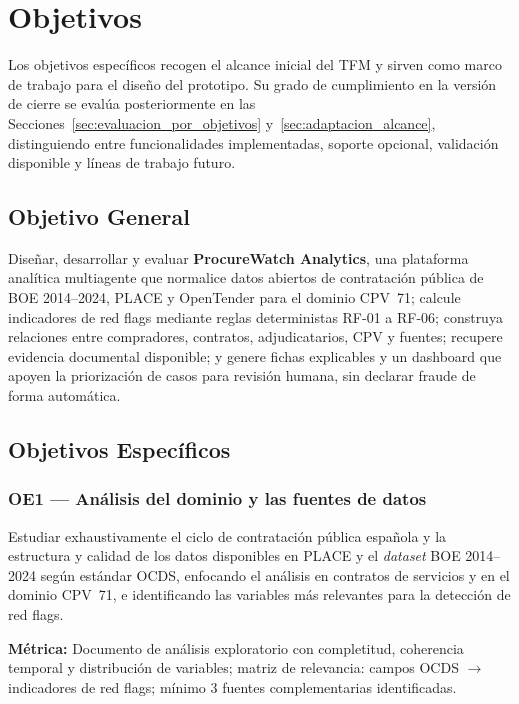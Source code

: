 \documentclass[11pt,a4paper,spanish]{book}
\numberwithin{equation}{chapter}
\numberwithin{figure}{chapter}
\begin{document}
\chapter{Objetivos}

Los objetivos espec{\'i}ficos recogen el alcance inicial del TFM y sirven como marco de trabajo para el dise{\~n}o del prototipo. Su grado de cumplimiento en la versi{\'o}n de cierre se eval{\'u}a posteriormente en las Secciones~\ref{sec:evaluacion_por_objetivos} y~\ref{sec:adaptacion_alcance}, distinguiendo entre funcionalidades implementadas, soporte opcional, validaci{\'o}n disponible y l{\'i}neas de trabajo futuro.

\section{Objetivo General}

Dise{\~n}ar, desarrollar y evaluar \textbf{ProcureWatch Analytics}, una plataforma anal{\'i}tica multiagente que normalice datos abiertos de contrataci{\'o}n p{\'u}blica de BOE 2014--2024, PLACE y OpenTender para el dominio CPV~71; calcule indicadores de red flags mediante reglas deterministas RF-01 a RF-06; construya relaciones entre compradores, contratos, adjudicatarios, CPV y fuentes; recupere evidencia documental disponible; y genere fichas explicables y un dashboard que apoyen la priorizaci{\'o}n de casos para revisi{\'o}n humana, sin declarar fraude de forma autom{\'a}tica.

\section{Objetivos Espec{\'i}ficos}

\subsection*{OE1 --- An{\'a}lisis del dominio y las fuentes de datos}
Estudiar exhaustivamente el ciclo de contrataci{\'o}n p{\'u}blica espa{\~n}ola y la estructura y calidad de los datos disponibles en PLACE y el \textit{dataset} BOE 2014--2024 seg{\'u}n est{\'a}ndar OCDS, enfocando el an{\'a}lisis en contratos de servicios y en el dominio CPV~71, e identificando las variables m{\'a}s relevantes para la detecci{\'o}n de red flags.

\textbf{M{\'e}trica:} Documento de an{\'a}lisis exploratorio con completitud, coherencia temporal y distribuci{\'o}n de variables; matriz de relevancia: campos OCDS $\rightarrow$ indicadores de red flags; m{\'i}nimo 3 fuentes complementarias identificadas.
\end{document}
